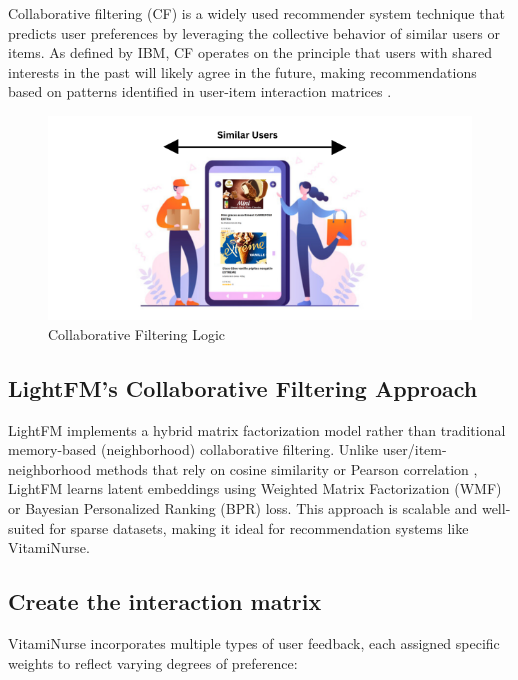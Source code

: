 Collaborative filtering (CF) is a widely used recommender system technique that predicts user preferences by leveraging the collective behavior of similar users or items. As defined by IBM, CF operates on the principle that users with shared interests in the past will likely agree in the future, making recommendations based on patterns identified in user-item interaction matrices .\cite{ibm-cf}

\begin{center}
    \begin{figure}[H]
        \includegraphics[scale=0.85]{images/collaborative_filtering.png}
        \caption{Collaborative Filtering Logic}
        \label{fig:cf_workflow}
    \end{figure}
\end{center}

\subsection{LightFM's Collaborative Filtering Approach}
LightFM  implements a hybrid matrix factorization model rather than traditional memory-based (neighborhood) collaborative filtering. Unlike user/item-neighborhood methods that rely on cosine similarity or Pearson correlation \cite{ibm-cf}, LightFM learns latent embeddings using Weighted Matrix Factorization (WMF) or Bayesian Personalized Ranking (BPR) loss. This approach is scalable and well-suited for sparse datasets, making it ideal for recommendation systems like VitamiNurse.

\subsection{Create the interaction matrix}
VitamiNurse incorporates multiple types of user feedback, each assigned specific weights to reflect varying degrees of preference:

